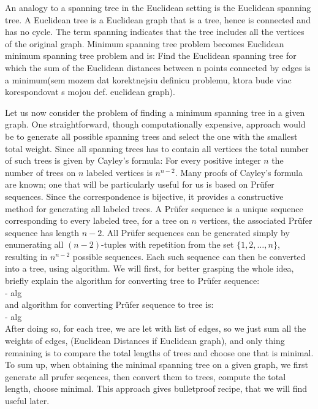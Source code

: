 \documentclass[12pt]{article}
\begin{document}
		An analogy to a spanning tree in the Euclidean setting is the Euclidean spanning tree. A Euclidean tree is a Euclidean graph that is a tree, hence is connected and has no cycle. The term spanning indicates that the tree includes all the vertices of the original graph. Minimum spanning tree problem becomes Euclidean minimum spanning tree problem and is: Find the Euclidean spanning tree for which the sum of the Euclidean distances between n points connected by edges is a minimum(sem mozem dat korektnejsiu definicu problemu, ktora bude viac korespondovat s mojou def. euclidean graph). 
		
		Let us now consider the problem of finding a minimum spanning tree in a given graph. One straightforward, though computationally expensive, approach would be to generate all possible spanning trees and select the one with the smallest total weight. Since all spanning trees has to contain all vertices the total number of such trees is given by Cayley’s formula: For every positive integer \(n\) the number of trees on \(n\) labeled vertices is \(n^{n-2}\). Many proofs of Cayley's formula are known; one that will be particularly useful for us is based on Prüfer sequences.  
		Since the correspondence is bijective, it provides a constructive method for generating all labeled trees. A Prüfer sequence is a unique sequence corresponding to every labeled tree, for a tree on \( n \) vertices, the associated Prüfer sequence has length \( n - 2 \). All Prüfer sequences can be generated simply by enumerating all \( (n - 2) \)-tuples with repetition from the set \( \{1, 2, \dots, n\} \), resulting in \( n^{n-2} \) possible sequences. Each such sequence can then be converted into a tree, using algorithm. We will first, for better grasping the whole idea, briefly explain the algorithm for converting tree to Prüfer sequence:
		\\- alg
		\\and algorithm for converting Prüfer sequence to tree is:
		\\- alg
		\\After doing so, for each tree, we are let with list of edges, so we just sum all the weights of edges, (Euclidean Distances if Euclidean graph), and only thing remaining is to compare the total lengths of trees and choose one that is minimal. To sum up, when obtaining the minimal spanning tree on a given graph, we first generate all prufer seqences, then convert them to trees, compute the total length, choose minimal. This approach gives bulletproof recipe, that we will find useful later.   
	
\end{document}
